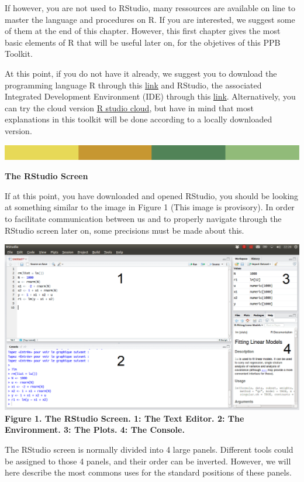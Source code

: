 \documentclass[
]{book}
\begin{document}
If however, you are not used to RStudio, many ressources are available on line to master the language and procedures on R. If you are interested, we suggest some of them at the end of this chapter. However, this first chapter gives the most basic elements of R that will be useful later on, for the objetives of this PPB Toolkit.

At this point, if you do not have it already, we suggest you to download the programming language R through this \href{https://www.r-project.org/}{link} and RStudio, the associated Integrated Development Environment (IDE) through this \href{https://www.rstudio.com/products/rstudio/download/}{link}. Alternatively, you can try the cloud version \href{https://rstudio.cloud/}{R studio cloud}, but have in mind that most explanations in this toolkit will be done according to a locally downloaded version.

\includegraphics{rsrstrip.png}

\textbf{The RStudio Screen}

If at this point, you have downloaded and opened RStudio, you should be looking at something similar to the image in Figure 1 (This image is provisory). In order to facilitate communication between us and to properly navigate through the RStudio screen later on, some precisions must be made about this.

\includegraphics{Rstudio screen 2.png}
\textbf{Figure 1. The RStudio Screen. 1: The Text Editor. 2: The Environment. 3: The Plots. 4: The Console. }

The RStudio screen is normally divided into 4 large panels. Different tools could be assigned to those 4 panels, and their order can be inverted. However, we will here describe the most commons uses for the standard positions of these panels.
\end{document}

